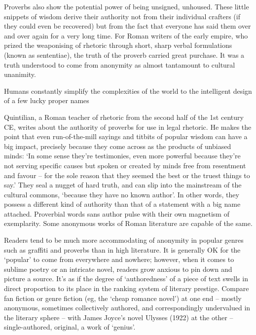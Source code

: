 \documentclass[../main.tex]{subfiles}
\begin{document}
\begin{multicols}{2}
Proverbs also show the potential power of being unsigned, unhoused. These little snippets of wisdom derive their authority not from their individual crafters (if they could even be recovered) but from the fact that everyone has said them over and over again for a very long time. For Roman writers of the early empire, who prized the weaponising of rhetoric through short, sharp verbal formulations (known as sententiae), the truth of the proverb carried great purchase. It was a truth understood to come from anonymity as almost tantamount to cultural unanimity. 

\begin{pullquote}
 Humans constantly simplify the complexities of the world to the intelligent design of a few lucky proper names 
\end{pullquote}

Quintilian, a Roman teacher of rhetoric from the second half of the 1st century CE, writes about the authority of proverbs for use in legal rhetoric. He makes the point that even run-of-the-mill sayings and titbits of popular wisdom can have a big impact, precisely because they come across as the products of unbiased minds: ‘In some sense they’re testimonies, even more powerful because they’re not serving specific causes but spoken or created by minds free from resentment and favour – for the sole reason that they seemed the best or the truest things to say.’ They seal a nugget of hard truth, and can slip into the mainstream of the cultural commons, ‘because they have no known author’. In other words, they possess a different kind of authority than that of a statement with a big name attached. Proverbial words sans author pulse with their own magnetism of exemplarity. Some anonymous works of Roman literature are capable of the same. 

Readers tend to be much more accommodating of anonymity in popular genres such as graffiti and proverbs than in high literature. It is generally OK for the ‘popular’ to come from everywhere and nowhere; however, when it comes to sublime poetry or an intricate novel, readers grow anxious to pin down and picture a source. It’s as if the degree of ‘authoredness’ of a piece of text swells in direct proportion to its place in the ranking system of literary prestige. Compare fan fiction or genre fiction (eg, the ‘cheap romance novel’) at one end – mostly anonymous, sometimes collectively authored, and correspondingly undervalued in the literary sphere – with James Joyce’s novel Ulysses (1922) at the other – single-authored, original, a work of ‘genius’. 


\end{multicols}
\end{document}
